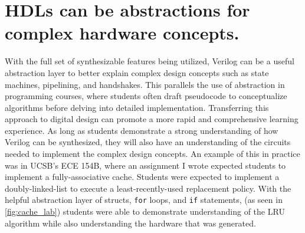 \FloatBarrier

\section{HDLs can be abstractions for complex hardware concepts.}



With the full set of synthesizable features being utilized, Verilog can be a useful abstraction layer to better explain complex design concepts such as state machines, pipelining, and handshakes. This parallels the use of abstraction in programming courses, where students often draft pseudocode to conceptualize algorithms before delving into detailed implementation. Transferring this approach to digital design can promote a more rapid and comprehensive learning experience. As long as students demonstrate a strong understanding of how Verilog can be synthesized, they will also have an understanding of the circuits needed to implement the complex design concepts. An example of this in practice was in UCSB's ECE 154B, where an assignment I wrote expected students to implement a fully-associative cache. Students were expected to implement a doubly-linked-list to execute a least-recently-used replacement policy. With the helpful abstraction layer of structs, \texttt{for} loops, and \texttt{if} statements, (as seen in \autoref{fig:cache_lab}) students were able to demonstrate understanding of the LRU algorithm while also understanding the hardware that was generated.
